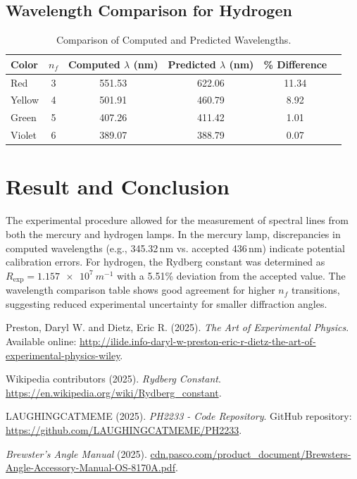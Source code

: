 \documentclass[12pt]{article}
\begin{document}
\subsection{Wavelength Comparison for Hydrogen}
\begin{table}[H]
  \centering
  \caption{Comparison of Computed and Predicted Wavelengths.}
  \begin{tabular}{lccccc}
    \toprule
    Color   & \(n_f\) & Computed \(\lambda\) (nm) & Predicted \(\lambda\) (nm) & \% Difference \\
    \midrule
    Red     & 3 & 551.53 & 622.06 & 11.34 \\
    Yellow  & 4 & 501.91 & 460.79 & 8.92 \\
    Green   & 5 & 407.26 & 411.42 & 1.01 \\
    Violet  & 6 & 389.07 & 388.79 & 0.07 \\
    \bottomrule
  \end{tabular}
  \label{tab:comparison}
\end{table}

\section{Result and Conclusion}
The experimental procedure allowed for the measurement of spectral lines from both the mercury and hydrogen lamps. In the mercury lamp, discrepancies in computed wavelengths (e.g., 345.32\,nm vs. accepted 436\,nm) indicate potential calibration errors. For hydrogen, the Rydberg constant was determined as \(R_{\text{exp}} = \SI{1.157e7}{m^{-1}}\) with a 5.51\% deviation from the accepted value. The wavelength comparison table shows good agreement for higher \(n_f\) transitions, suggesting reduced experimental uncertainty for smaller diffraction angles.

\vspace{6cm}
\begin{thebibliography}{9}
Preston, Daryl W. and Dietz, Eric R. (2025). \textit{The Art of Experimental Physics}. Available online: \url{http://ilide.info-daryl-w-preston-eric-r-dietz-the-art-of-experimental-physics-wiley}.

Wikipedia contributors (2025). \textit{Rydberg Constant}. \url{https://en.wikipedia.org/wiki/Rydberg_constant}.

LAUGHINGCATMEME (2025). \textit{PH2233 - Code Repository}. GitHub repository: \url{https://github.com/LAUGHINGCATMEME/PH2233}.

\textit{Brewster's Angle Manual} (2025). \url{cdn.pasco.com/product_document/Brewsters-Angle-Accessory-Manual-OS-8170A.pdf}.
\end{thebibliography}
\end{document}
